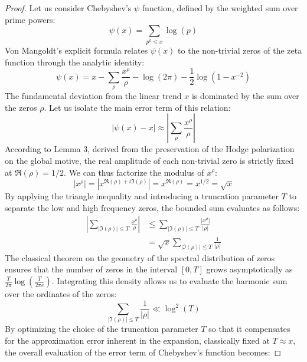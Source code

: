 \documentclass[
]{article}
\begin{document}
\begin{proof}
Let us consider Chebyshev's $\psi$ function, defined by the weighted sum over prime powers:
\begin{equation*}
\psi(x) = \sum_{p^k \le x} \log(p)
\end{equation*}
Von Mangoldt's explicit formula relates $\psi(x)$ to the non-trivial zeros of the zeta function through the analytic identity:
\begin{equation*}
\psi(x) = x - \sum_{\rho} \frac{x^{\rho}}{\rho} - \log(2\pi) - \frac{1}{2} \log(1 - x^{-2})
\end{equation*}
The fundamental deviation from the linear trend $x$ is dominated by the sum over the zeros $\rho$.
Let us isolate the main error term of this relation:
\begin{equation*}
\left| \psi(x) - x \right| \approx \left| \sum_{\rho} \frac{x^{\rho}}{\rho} \right|
\end{equation*}
According to Lemma 3, derived from the preservation of the Hodge polarization on the global motive, the real amplitude of each non-trivial zero is strictly fixed at $\Re(\rho) = 1/2$.
We can thus factorize the modulus of $x^{\rho}$:
\begin{equation*}
\left| x^{\rho} \right| = \left| x^{\Re(\rho) + i\Im(\rho)} \right| = x^{\Re(\rho)} = x^{1/2} = \sqrt{x}
\end{equation*}
By applying the triangle inequality and introducing a truncation parameter $T$ to separate the low and high frequency zeros, the bounded sum evaluates as follows:
\begin{align*}
\left| \sum_{|\Im(\rho)| \le T} \frac{x^{\rho}}{\rho} \right| &\le \sum_{|\Im(\rho)| \le T} \frac{|x^{\rho}|}{|\rho|} \\
&= \sqrt{x} \sum_{|\Im(\rho)| \le T} \frac{1}{|\rho|}
\end{align*}
The classical theorem on the geometry of the spectral distribution of zeros ensures that the number of zeros in the interval $[0, T]$ grows asymptotically as $\frac{T}{2\pi} \log\left(\frac{T}{2\pi e}\right)$.
Integrating this density allows us to evaluate the harmonic sum over the ordinates of the zeros:
\begin{equation*}
\sum_{|\Im(\rho)| \le T} \frac{1}{|\rho|} \ll \log^2(T)
\end{equation*}
By optimizing the choice of the truncation parameter $T$ so that it compensates for the approximation error inherent in the expansion, classically fixed at $T \approx x$, the overall evaluation of the error term of Chebyshev's function becomes:

\end{proof}
\end{document}
